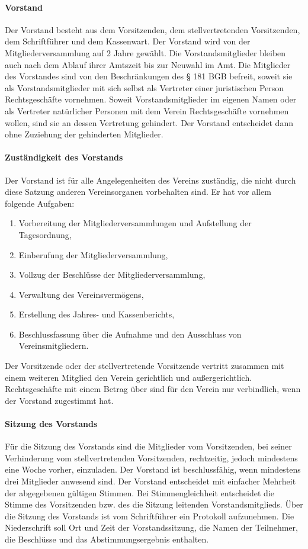 \begin{multicols}{2}
\paragraph{Vorstand}
Der Vorstand besteht aus dem Vorsitzenden, dem stellvertretenden
Vorsitzenden, dem Schriftführer und dem Kassenwart. Der Vorstand wird
von der Mitgliederversammlung auf 2 Jahre gewählt. Die
Vorstandsmitglieder bleiben auch nach dem Ablauf ihrer Amtszeit bis zur
Neuwahl im Amt. Die Mitglieder des Vorstandes sind von den
Beschränkungen des § 181 BGB befreit, soweit sie als Vorstandsmitglieder
mit sich selbst als Vertreter einer juristischen Person Rechtsgeschäfte
vornehmen. Soweit Vorstandsmitglieder im eigenen Namen oder als
Vertreter natürlicher Personen mit dem Verein Rechtsgeschäfte vornehmen
wollen, sind sie an dessen Vertretung gehindert. Der Vorstand entscheidet
dann ohne Zuziehung der gehinderten Mitglieder.
\paragraph{Zuständigkeit des Vorstands}
Der Vorstand ist für alle Angelegenheiten des Vereins zuständig, die nicht
durch diese Satzung anderen Vereinsorganen vorbehalten sind.
Er hat vor allem folgende Aufgaben:

\begin{enumerate}
\setlength{\itemsep}{-2pt}
\item Vorbereitung der Mitgliederversammlungen und Aufstellung der
Tagesordnung,
\item Einberufung der Mitgliederversammlung,
\item Vollzug der Beschlüsse der Mitgliederversammlung,
\item Verwaltung des Vereinsvermögens,
\item Erstellung des Jahres- und Kassenberichts,
\item Beschlussfassung über die Aufnahme und den Ausschluss von Vereinsmitgliedern.
\end{enumerate}

Der Vorsitzende oder der stellvertretende Vorsitzende vertritt zusammen
mit einem weiteren Mitglied den Verein gerichtlich und außergerichtlich.
Rechtsgeschäfte mit einem Betrag über   sind für den Verein nur
verbindlich, wenn der Vorstand zugestimmt hat.

\paragraph{Sitzung des Vorstands}
Für die Sitzung des Vorstands sind die Mitglieder vom Vorsitzenden, bei
seiner Verhinderung vom stellvertretenden Vorsitzenden, rechtzeitig, jedoch
mindestens eine Woche vorher, einzuladen. Der Vorstand ist
beschlussfähig, wenn mindestens drei Mitglieder anwesend sind. Der
Vorstand entscheidet mit einfacher Mehrheit der abgegebenen gültigen
Stimmen. Bei Stimmengleichheit entscheidet die Stimme des Vorsitzenden
bzw. des die Sitzung leitenden Vorstandsmitglieds. Über die Sitzung des
Vorstands ist vom Schriftführer ein Protokoll aufzunehmen. Die
Niederschrift soll Ort und Zeit der Vorstandssitzung, die Namen der
Teilnehmer, die Beschlüsse und das Abstimmungsergebnis enthalten.


\end{multicols}
